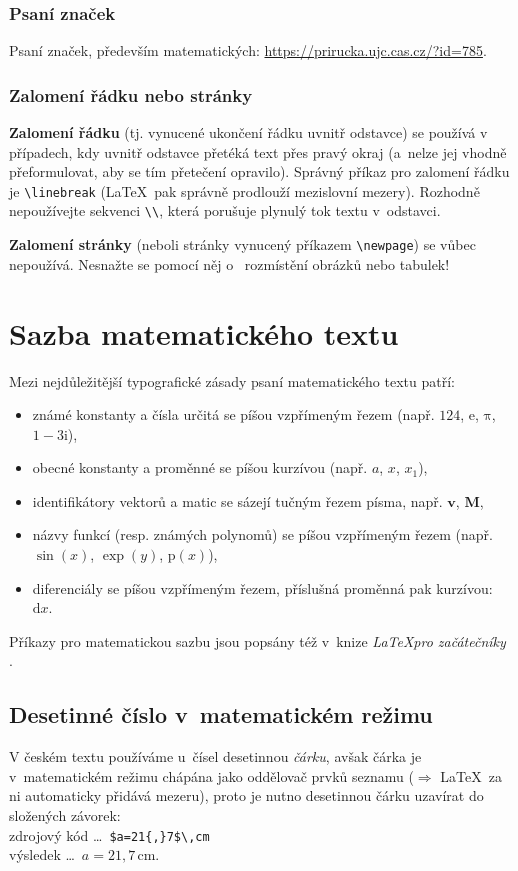 \subsubsection*{Psaní značek}
Psaní značek, především matematických: \url{https://prirucka.ujc.cas.cz/?id=785}.

\subsubsection{Zalomení řádku nebo stránky}
\textbf{Zalomení řádku} (tj. vynucené ukončení řádku uvnitř odstavce) se používá v případech, kdy uvnitř odstavce přetéká text přes pravý okraj (a~nelze jej vhodně přeformulovat, aby se tím přetečení opravilo). Správný příkaz pro zalomení řádku je \texttt{\textbackslash linebreak} (\LaTeX\ pak správně prodlouží mezislovní mezery). Rozhodně nepoužívejte sekvenci \texttt{\textbackslash\textbackslash}, která porušuje plynulý tok textu v~odstavci.

\textbf{Zalomení stránky} (neboli  stránky vynucený příkazem \texttt{\textbackslash newpage}) se vůbec nepoužívá. Nesnažte se pomocí něj o~ rozmístění obrázků nebo tabulek!

\section{Sazba matematického textu}

Mezi nejdůležitější typografické zásady psaní matematického textu patří:
\begin{itemize}\itemsep=1pt
\item známé konstanty a čísla určitá se píšou vzpřímeným řezem (např. $124$, $\mathrm e$, $\mathrm{\pi}$, $1-3\mathrm i$),
\item obecné konstanty a proměnné se píšou kurzívou (např. $a$, $x$, $x_1$),
\item identifikátory vektorů a matic se sázejí tučným řezem písma, např. $\mathbf{v}$, $\mathbf{M}$,
\item názvy funkcí (resp. známých polynomů) se píšou vzpřímeným řezem (např. $\sin(x)$, $\exp(y)$, $\mathrm{p}(x)$),
\item diferenciály se píšou vzpřímeným řezem, příslušná proměnná pak kurzívou: $\mathrm{d}x$.
\end{itemize}

Příkazy pro matematickou sazbu jsou popsány též v~knize \textit{\LaTeX pro začátečníky} \cite{Rybicka2003}.


\subsection{Desetinné číslo v~matematickém režimu} \label{des_cislo}
V českém textu používáme u~čísel desetinnou {\em čárku}, avšak čárka je v~mate\-ma\-tickém režimu
chápána jako oddělovač prvků seznamu ($\Rightarrow$ \LaTeX\ za ni automaticky přidává mezeru), proto je nutno desetinnou čárku uzavírat do složených závorek: \\
zdrojový kód \dots\ {\tt \$a=21\{,\}7\$\textbackslash,cm}\\ 
výsledek \dots\ $a=21{,}7$\,cm.


